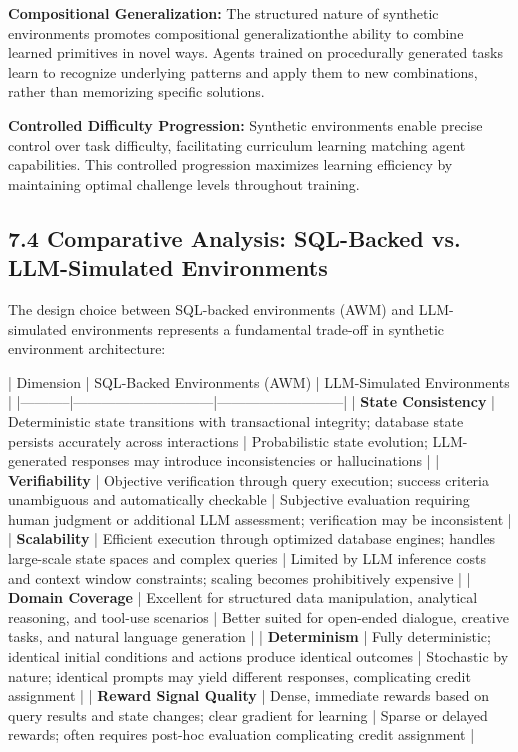 \textbf{Compositional Generalization:} The structured nature of synthetic environments promotes compositional generalizationthe ability to combine learned primitives in novel ways. Agents trained on procedurally generated tasks learn to recognize underlying patterns and apply them to new combinations, rather than memorizing specific solutions.

\textbf{Controlled Difficulty Progression:} Synthetic environments enable precise control over task difficulty, facilitating curriculum learning matching agent capabilities. This controlled progression maximizes learning efficiency by maintaining optimal challenge levels throughout training.

\subsection{7.4 Comparative Analysis: SQL-Backed vs. LLM-Simulated Environments}

The design choice between SQL-backed environments (AWM) and LLM-simulated environments represents a fundamental trade-off in synthetic environment architecture:

| Dimension | SQL-Backed Environments (AWM) | LLM-Simulated Environments |
|-----------|------------------------------|---------------------------|
| \textbf{State Consistency} | Deterministic state transitions with transactional integrity; database state persists accurately across interactions | Probabilistic state evolution; LLM-generated responses may introduce inconsistencies or hallucinations |
| \textbf{Verifiability} | Objective verification through query execution; success criteria unambiguous and automatically checkable | Subjective evaluation requiring human judgment or additional LLM assessment; verification may be inconsistent |
| \textbf{Scalability} | Efficient execution through optimized database engines; handles large-scale state spaces and complex queries | Limited by LLM inference costs and context window constraints; scaling becomes prohibitively expensive |
| \textbf{Domain Coverage} | Excellent for structured data manipulation, analytical reasoning, and tool-use scenarios | Better suited for open-ended dialogue, creative tasks, and natural language generation |
| \textbf{Determinism} | Fully deterministic; identical initial conditions and actions produce identical outcomes | Stochastic by nature; identical prompts may yield different responses, complicating credit assignment |
| \textbf{Reward Signal Quality} | Dense, immediate rewards based on query results and state changes; clear gradient for learning | Sparse or delayed rewards; often requires post-hoc evaluation complicating credit assignment |

